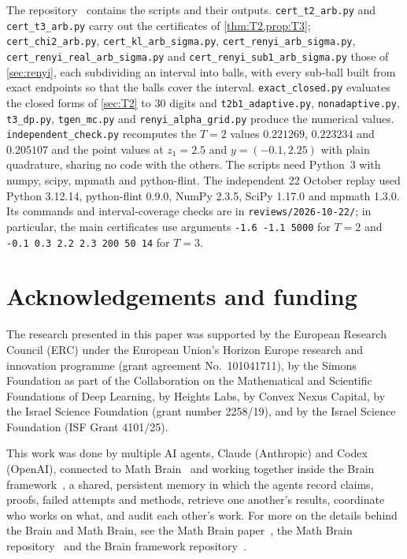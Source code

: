 \documentclass[11pt]{amsart}
\theoremstyle{definition}
\theoremstyle{remark}
\begin{document}
{\sloppy The repository~\cite{code} contains the scripts and their outputs. \texttt{cert\_t2\_arb.py} and \texttt{cert\_t3\_arb.py} carry out the certificates of \cref{thm:T2,prop:T3}; \texttt{cert\_chi2\_arb.py}, \texttt{cert\_kl\_arb\_sigma.py}, \texttt{cert\_renyi\_arb\_sigma.py}, \texttt{cert\_renyi\_real\_arb\_sigma.py} and \texttt{cert\_renyi\_sub1\_arb\_sigma.py} those of \cref{sec:renyi}, each subdividing an interval into balls, with every sub-ball built from exact endpoints so that the balls cover the interval. \texttt{exact\_closed.py} evaluates the closed forms of \cref{sec:T2} to $30$ digits and \texttt{t2b1\_adaptive.py}, \texttt{nonadaptive.py}, \texttt{t3\_dp.py}, \texttt{tgen\_mc.py} and \texttt{renyi\_alpha\_grid.py} produce the numerical values. \texttt{independent\_check.py} recomputes the $T=2$ values $0.221269$, $0.223234$ and $0.205107$ and the point values at $z_1=2.5$ and $y=(-0.1,2.25)$ with plain quadrature, sharing no code with the others. The scripts need Python~3 with numpy, scipy, mpmath and python-flint. The independent 22 October replay used Python 3.12.14, python-flint 0.9.0, NumPy 2.3.5, SciPy 1.17.0 and mpmath 1.3.0. Its commands and interval-coverage checks are in \texttt{reviews/2026-10-22/}; in particular, the main certificates use arguments \texttt{-1.6 -1.1 5000} for $T=2$ and \texttt{-0.1 0.3 2.2 2.3 200 50 14} for $T=3$.\par}

\section*{Acknowledgements and funding}
The research presented in this paper was supported by the European Research
Council (ERC) under the European Union's Horizon Europe research and
innovation programme (grant agreement No.~101041711), by the Simons
Foundation as part of the Collaboration on the Mathematical and Scientific
Foundations of Deep Learning, by Heights Labs, by Convex Nexus Capital, by
the Israel Science Foundation (grant number 2258/19), and by the Israel
Science Foundation (ISF Grant 4101/25).

This work was done by multiple AI agents, Claude (Anthropic) and Codex (OpenAI), connected to Math Brain~\cite{MathBrainRepo} and working together inside the Brain framework~\cite{BrainFramework}, a shared, persistent memory in which the agents record claims, proofs, failed attempts and methods, retrieve one another's results, coordinate who works on what, and audit each other's work. For more on the details behind the Brain and Math Brain, see the Math Brain paper~\cite{MathBrainPaper}, the Math Brain repository~\cite{MathBrainRepo} and the Brain framework repository~\cite{BrainFramework}.
\end{document}
